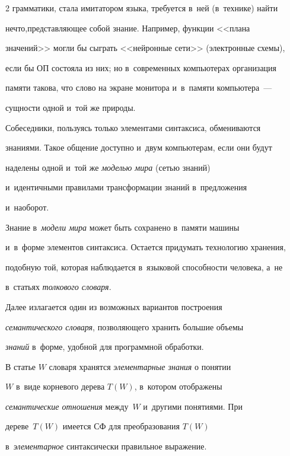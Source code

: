 \begin{multicols}{2}
грамматики, стала имитатором языка, требуется в~ней (в~технике) найти 

нечто,\linebreak представляющее собой знание. Например, функции <<плана 

значений>> могли бы сыграть <<нейронные сети>> (электронные схемы), 

если бы ОП состояла из них; но в~современных компьютерах \mbox{организация} 

памяти такова, что слово на экране монитора и~в~памяти компьютера~--- 

сущности одной и~той же природы.

     

     Собеседники, пользуясь только элементами синтаксиса, обмениваются 

знаниями. Такое общение доступно и~двум компьютерам, если они будут 

наделены одной и~той же \textit{моделью мира} (сетью знаний) 

и~идентичными правилами трансформации знаний в~предложения 

и~наоборот.

     

     Знание в~\textit{модели мира} может быть сохранено в~памяти машины 

и~в~форме элементов синтаксиса. Остается придумать технологию хранения, 

подобную той, которая наблюдается в~языковой способности человека, а~не 

в~статьях \textit{толкового словаря}.

     

     Далее излагается один из возможных вариантов построения 

\textit{семантического словаря}, позволяющего хранить большие объемы 

\textit{знаний} в~форме, удобной для программной обработки. 

     

     В статье $W$ словаря хранятся \textit{элементарные знания} о понятии 

$W$ в~виде корневого дерева $T(W)$, в~котором отображены 

\textit{семантические отношения} между~$W$ и~другими понятиями. При 

дереве~$T(W)$ имеется СФ для преобразования $T(W)$ 

в~\textit{элементарное} синтаксически правильное выражение.


\end{multicols}

